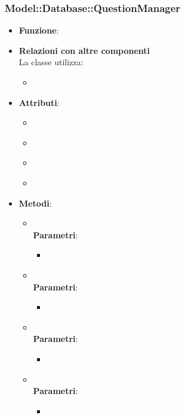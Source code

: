 \subsubsection{Model::Database::QuestionManager}
\begin{itemize}
\item\textbf{Funzione}:
\item\textbf{Relazioni con altre componenti}\\
La classe utilizza:
	\begin{itemize}
		\item
	\end{itemize}
\item\textbf{Attributi}:
	\begin{itemize}
		\item\code{}\\
		\item\code{}\\
		\item\code{}\\
		\item\code{}\\
	\end{itemize}
\item\textbf{Metodi}:
	\begin{itemize}
		\item\code{}\\
		\textbf{Parametri}:
			\begin{itemize}
				\item\code{}\\
			\end{itemize}
		\item\code{}\\
		\textbf{Parametri}:
			\begin{itemize}
				\item\code{}\\
			\end{itemize}
		\item\code{}\\
		\textbf{Parametri}:
			\begin{itemize}
				\item\code{}\\
			\end{itemize}
		\item\code{}\\
		\textbf{Parametri}:
			\begin{itemize}
				\item\code{}\\
			\end{itemize}
	\end{itemize}
\end{itemize}

